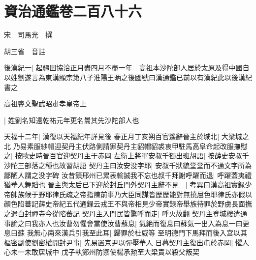 \section{資治通鑑卷二百八十六}
宋　司馬光　撰

胡三省　音註

後漢紀一|{
	起疆圉協洽正月盡四月不盡一年　高祖本沙陀部人居於太原及得中國自以姓劉遂言為東漢顯宗第八子淮陽王昞之後國號曰漢通鑑已前以有漢紀此以後漢紀書之}


高祖睿文聖武昭肅孝皇帝上

|{
	姓劉名知遠乾祐元年更名暠其先沙陀部人也}


天福十二年|{
	漢復以天福紀年詳見後}
春正月丁亥朔百官遙辭晉主於城北|{
	大梁城之北}
乃易素服紗帽迎契丹主伏路側請罪契丹主貂帽貂裘衷甲駐馬高阜命起改服撫慰之|{
	按歐史時晉百官迎契丹主于赤岡}
左衛上將軍安叔千獨出班胡語|{
	按薛史安叔千沙陀三部落之種也故習胡語}
契丹主曰汝安没字耶|{
	安叔千狀貌堂堂而不通文字所為鄙陋人謂之没字碑}
汝昔鎮邢州已累表輸誠我不忘也叔千拜謝呼躍而退|{
	呼躍蓋夷禮猶華人舞蹈也}
晉主與太后已下迎於封丘門外契丹主辭不見　|{
	考異曰漢高祖實録少帝帥族候于野耶律氏疏之帝指陳前事乃大臣同謀皆歷歷能對無撓屈色耶律氏亦假以顔色陷蕃記薛史帝紀五代通録云戎王不與帝相見少帝實録帝舉族待罪於野虜長面撫之遣白封禪寺今從陷蕃記}
契丹主入門民皆驚呼而走|{
	呼火故翻}
契丹主登城樓遣通事諭之曰我亦人也汝曹勿懼會當使汝曹蘇息|{
	氣絶而復息曰蘇氣一出入為息一曰更息曰蘇}
我無心南來漢兵引我至此耳|{
	歸罪於杜威等}
至明德門下馬拜而後入宫以其樞密副使劉密權開封尹事|{
	先易置京尹以彈壓華人}
日暮契丹主復出屯於赤岡|{
	懼人心未一未敢居城中}
戊子執鄭州防禦使楊承勲至大梁責以殺父叛契

